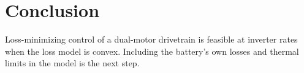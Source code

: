 \chapter{Conclusion}
\label{ch:conclusion}

Loss-minimizing control of a dual-motor drivetrain is feasible at inverter rates when the loss
model is convex. Including the battery's own losses and thermal limits in the model is the
next step.
